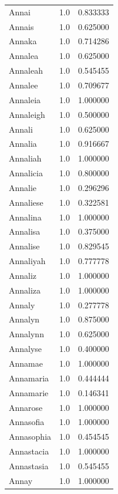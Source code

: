 \documentclass[
  letterpaper,
  DIV=11,
  numbers=noendperiod]{scrreprt}
\begin{document}
\begin{tabular}{lrr}
Annai           &   1.0 &   0.833333 \\
Annais          &   1.0 &   0.625000 \\
Annaka          &   1.0 &   0.714286 \\
Annalea         &   1.0 &   0.625000 \\
Annaleah        &   1.0 &   0.545455 \\
Annalee         &   1.0 &   0.709677 \\
Annaleia        &   1.0 &   1.000000 \\
Annaleigh       &   1.0 &   0.500000 \\
Annali          &   1.0 &   0.625000 \\
Annalia         &   1.0 &   0.916667 \\
Annaliah        &   1.0 &   1.000000 \\
Annalicia       &   1.0 &   0.800000 \\
Annalie         &   1.0 &   0.296296 \\
Annaliese       &   1.0 &   0.322581 \\
Annalina        &   1.0 &   1.000000 \\
Annalisa        &   1.0 &   0.375000 \\
Annalise        &   1.0 &   0.829545 \\
Annaliyah       &   1.0 &   0.777778 \\
Annaliz         &   1.0 &   1.000000 \\
Annaliza        &   1.0 &   1.000000 \\
Annaly          &   1.0 &   0.277778 \\
Annalyn         &   1.0 &   0.875000 \\
Annalynn        &   1.0 &   0.625000 \\
Annalyse        &   1.0 &   0.400000 \\
Annamae         &   1.0 &   1.000000 \\
Annamaria       &   1.0 &   0.444444 \\
Annamarie       &   1.0 &   0.146341 \\
Annarose        &   1.0 &   1.000000 \\
Annasofia       &   1.0 &   1.000000 \\
Annasophia      &   1.0 &   0.454545 \\
Annastacia      &   1.0 &   1.000000 \\
Annastasia      &   1.0 &   0.545455 \\
Annay           &   1.0 &   1.000000 \\

\end{tabular}
\end{document}
